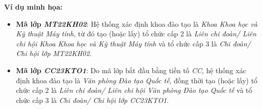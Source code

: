 \textbf{Ví dụ minh họa:}
\begin{itemize}[leftmargin=2em]
    \item \textbf{Mã lớp \textit{MT22KH02}}: Hệ thống xác định khoa đào tạo là \textit{Khoa Khoa học và Kỹ thuật Máy tính}, từ đó tạo (hoặc lấy) tổ chức cấp 2 là \textit{Liên chi đoàn/ Liên chi hội Khoa Khoa học và Kỹ thuật Máy tính} và tổ chức cấp 3 là \textit{Chi đoàn/ Chi hội lớp MT22KH02}.
    
    \item \textbf{Mã lớp \textit{CC23KTO1}}: Do mã lớp bắt đầu bằng tiền tố \textit{CC}, hệ thống xác định khoa đào tạo là \textit{Văn phòng Đào tạo Quốc tế}, đồng thời tạo (hoặc lấy) tổ chức cấp 2 là \textit{Liên chi đoàn/ Liên chi hội Văn phòng Đào tạo Quốc tế} và tổ chức cấp 3 là \textit{Chi đoàn/ Chi hội lớp CC23KTO1}.
\end{itemize}